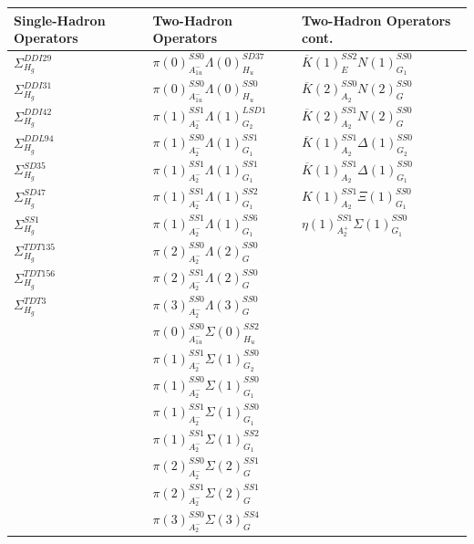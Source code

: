 \begin{table}[H]
    \centering
    \begin{tabular}{l|l|l}
        \textbf{Single-Hadron Operators} & \textbf{Two-Hadron Operators} & \textbf{Two-Hadron Operators cont.}\\
        \hline
        $\Sigma_{H_g}^{DDI29}$ & $\pi(0)_{A_{1u}^-}^{SS0}\Lambda(0)_{H_u}^{SD37}$ & $\overline K(1)_{E}^{SS2}N(1)_{G_1}^{SS0}$\\
        $\Sigma_{H_g}^{DDI31}$ & $\pi(0)_{A_{1u}^-}^{SS0}\Lambda(0)_{H_u}^{SS0}$ & $\overline K(2)_{A_2}^{SS0}N(2)_{G}^{SS0}$\\
        $\Sigma_{H_g}^{DDI42}$ & $\pi(1)_{A_2^-}^{SS1}\Lambda(1)_{G_2}^{LSD1}$ & $\overline K(2)_{A_2}^{SS1}N(2)_{G}^{SS0}$\\
        $\Sigma_{H_g}^{DDL94}$ & $\pi(1)_{A_2^-}^{SS0}\Lambda(1)_{G_1}^{SS1}$ & $\overline K(1)_{A_2}^{SS1}\Delta(1)_{G_2}^{SS0}$\\
        $\Sigma_{H_g}^{SD35}$ & $\pi(1)_{A_2^-}^{SS1}\Lambda(1)_{G_1}^{SS1}$ & $\overline K(1)_{A_2}^{SS1}\Delta(1)_{G_1}^{SS0}$\\
        $\Sigma_{H_g}^{SD47}$ & $\pi(1)_{A_2^-}^{SS1}\Lambda(1)_{G_1}^{SS2}$ & $K(1)_{A_2}^{SS1}\Xi(1)_{G_1}^{SS0}$\\
        $\Sigma_{H_g}^{SS1}$ & $\pi(1)_{A_2^-}^{SS1}\Lambda(1)_{G_1}^{SS6}$ & $\eta(1)_{A_2^+}^{SS1}\Sigma(1)_{G_1}^{SS0}$\\
        $\Sigma_{H_g}^{TDT135}$ & $\pi(2)_{A_2^-}^{SS0}\Lambda(2)_{G}^{SS0}$ & \\
        $\Sigma_{H_g}^{TDT156}$ & $\pi(2)_{A_2^-}^{SS1}\Lambda(2)_{G}^{SS0}$ &\\
        $\Sigma_{H_g}^{TDT3}$ & $\pi(3)_{A_2^-}^{SS0}\Lambda(3)_{G}^{SS0}$ &\\
        & $\pi(0)_{A_{1u}^-}^{SS0}\Sigma(0)_{H_u}^{SS2}$ &\\
        & $\pi(1)_{A_2^-}^{SS1}\Sigma(1)_{G_2}^{SS0}$ &\\
        & $\pi(1)_{A_2^-}^{SS0}\Sigma(1)_{G_1}^{SS0}$ &\\
        & $\pi(1)_{A_2^-}^{SS1}\Sigma(1)_{G_1}^{SS0}$ &\\
        & $\pi(1)_{A_2^-}^{SS1}\Sigma(1)_{G_1}^{SS2}$ &\\
        & $\pi(2)_{A_2^-}^{SS0}\Sigma(2)_{G}^{SS1}$ &\\
        & $\pi(2)_{A_2^-}^{SS1}\Sigma(2)_{G}^{SS1}$ &\\
        & $\pi(3)_{A_2^-}^{SS0}\Sigma(3)_{G}^{SS4}$ &\\

\end{tabular}
\end{table}

